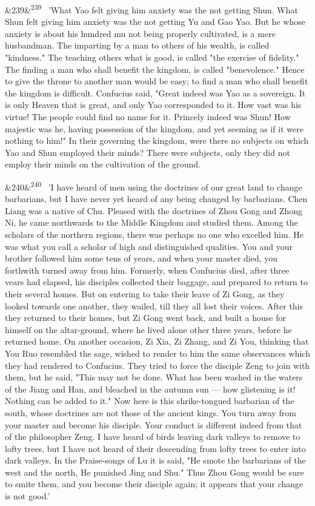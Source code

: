 \documentclass[12pt]{article}
\newcommand{\para}[1][]{\par\noindent\ifx&#1&\else\textsuperscript{\footnotesize #1}~\fi}
\begin{document}
\para[239] 'What Yao felt giving him anxiety was the not getting Shun. What Shun felt giving him anxiety was the not getting Yu and Gao Yao. But he whose anxiety is about his hundred mu not being properly cultivated, is a mere husbandman. The imparting by a man to others of his wealth, is called "kindness." The teaching others what is good, is called "the exercise of fidelity." The finding a man who shall benefit the kingdom, is called "benevolence." Hence to give the throne to another man would be easy; to find a man who shall benefit the kingdom is difficult. Confucius said, "Great indeed was Yao as a sovereign. It is only Heaven that is great, and only Yao corresponded to it. How vast was his virtue! The people could find no name for it. Princely indeed was Shun! How majestic was he, having possession of the kingdom, and yet seeming as if it were nothing to him!" In their governing the kingdom, were there no subjects on which Yao and Shun employed their minds? There were subjects, only they did not employ their minds on the cultivation of the ground.

\para[240] 'I have heard of men using the doctrines of our great land to change barbarians, but I have never yet heard of any being changed by barbarians. Chen Liang was a native of Chu. Pleased with the doctrines of Zhou Gong and Zhong Ni, he came northwards to the Middle Kingdom and studied them. Among the scholars of the northern regions, there was perhaps no one who excelled him. He was what you call a scholar of high and distinguished qualities. You and your brother followed him some tens of years, and when your master died, you forthwith turned away from him. Formerly, when Confucius died, after three vears had elapsed, his disciples collected their baggage, and prepared to return to their several homes. But on entering to take their leave of Zi Gong, as they looked towards one another, they wailed, till they all lost their voices. After this they returned to their homes, but Zi Gong went back, and built a house for himself on the altar-ground, where he lived alone other three years, before he returned home. On another occasion, Zi Xia, Zi Zhang, and Zi You, thinking that You Ruo resembled the sage, wished to render to him the same observances which they had rendered to Confucius. They tried to force the disciple Zeng to join with them, but he said, "This may not be done. What has been washed in the waters of the Jiang and Han, and bleached in the autumn sun --- how glistening is it! Nothing can be added to it." Now here is this shrike-tongued barbarian of the south, whose doctrines are not those of the ancient kings. You turn away from your master and become his disciple. Your conduct is different indeed from that of the philosopher Zeng. I have heard of birds leaving dark valleys to remove to lofty trees, but I have not heard of their descending from lofty trees to enter into dark valleys. In the Praise-songs of Lu it is said, "He smote the barbarians of the west and the north, He punished Jing and Shu." Thus Zhou Gong would be sure to smite them, and you become their disciple again; it appears that your change is not good.'
\end{document}
